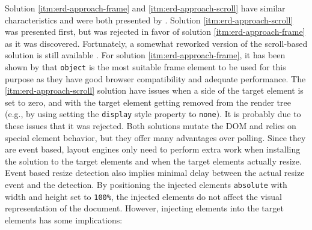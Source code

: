 \documentclass[a4paper,11pt]{kth-mag}
\newcommand{\code}[1]{\texttt{#1}}
\begin{document}
        Solution \ref{itm:erd-approach-frame} and \ref{itm:erd-approach-scroll} have similar characteristics and were both presented by \cite{backalley}.
        Solution \ref{itm:erd-approach-scroll} was presented first, but was rejected in favor of solution \ref{itm:erd-approach-frame} as it was discovered.
        Fortunately, a somewhat reworked version of the scroll-based solution is still available \cite{eq_imp_css-element-queries}.
        For solution \ref{itm:erd-approach-frame}, it has been shown by \cite{backalley} that \code{object} is the most suitable frame \gls{element} to be used for this purpose as they have good \gls{browser} compatibility and adequate performance.
        The \ref{itm:erd-approach-scroll} solution have issues when a side of the target element is set to zero, and with the target element getting removed from the render tree (e.g., by using setting the \code{display} style property to \code{none}).
        It is probably due to these issues that it was rejected.
        Both solutions mutate the \gls{DOM} and relies on special \gls{element} behavior, but they offer many advantages over polling.
        Since they are event based, layout engines only need to perform extra work when installing the solution to the target \glspl{element} and when the target \glspl{element} actually resize.
        Event based resize detection also implies minimal delay between the actual resize event and the detection.
        By positioning the injected elements \code{absolute} with width and height set to \code{100\%}, the injected \glspl{element} do not affect the visual representation of the \gls{document}.
        However, injecting elements into the target \glspl{element} has some implications:
\end{document}
